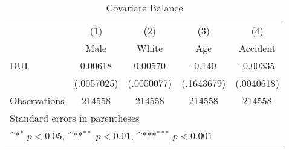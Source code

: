\begin{table}[htbp]\centering
\def\sym#1{\ifmmode^{#1}\else\(^{#1}\)\fi}
\caption{Covariate Balance}
\begin{tabular}{l*{4}{c}}
\hline\hline
                    &\multicolumn{1}{c}{(1)}&\multicolumn{1}{c}{(2)}&\multicolumn{1}{c}{(3)}&\multicolumn{1}{c}{(4)}\\
                    &\multicolumn{1}{c}{Male}&\multicolumn{1}{c}{White}&\multicolumn{1}{c}{Age}&\multicolumn{1}{c}{Accident}\\
\hline
DUI                 &     0.00618         &     0.00570         &      -0.140         &    -0.00335         \\
                    &  (.0057025)         &  (.0050077)         &  (.1643679)         &  (.0040618)         \\
\hline
Observations        &      214558         &      214558         &      214558         &      214558         \\
\hline\hline
\multicolumn{5}{l}{\footnotesize Standard errors in parentheses}\\
\multicolumn{5}{l}{\footnotesize \sym{*} \(p<0.05\), \sym{**} \(p<0.01\), \sym{***} \(p<0.001\)}\\
\end{tabular}
\end{table}
